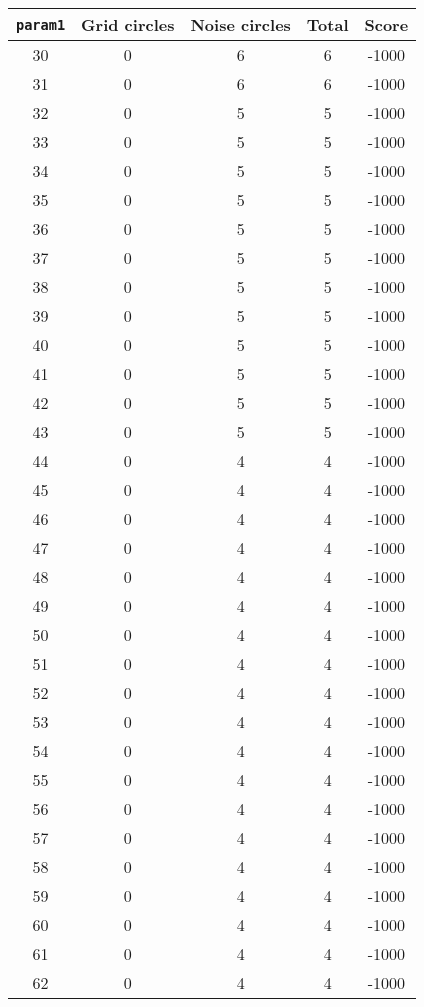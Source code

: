 \documentclass[letterpaper, 12pt]{article}
\begin{document}
\begin{longtable}{|c|c|c|c|c|}
\hline
\textbf{\texttt{param1}} & \textbf{Grid circles} & \textbf{Noise circles} & \textbf{Total} & \textbf{Score} \\
\hline
30 & 0 & 6 & 6 & -1000 \\
\hline
31 & 0 & 6 & 6 & -1000 \\
\hline
32 & 0 & 5 & 5 & -1000 \\
\hline
33 & 0 & 5 & 5 & -1000 \\
\hline
34 & 0 & 5 & 5 & -1000 \\
\hline
35 & 0 & 5 & 5 & -1000 \\
\hline
36 & 0 & 5 & 5 & -1000 \\
\hline
37 & 0 & 5 & 5 & -1000 \\
\hline
38 & 0 & 5 & 5 & -1000 \\
\hline
39 & 0 & 5 & 5 & -1000 \\
\hline
40 & 0 & 5 & 5 & -1000 \\
\hline
41 & 0 & 5 & 5 & -1000 \\
\hline
42 & 0 & 5 & 5 & -1000 \\
\hline
43 & 0 & 5 & 5 & -1000 \\
\hline
44 & 0 & 4 & 4 & -1000 \\
\hline
45 & 0 & 4 & 4 & -1000 \\
\hline
46 & 0 & 4 & 4 & -1000 \\
\hline
47 & 0 & 4 & 4 & -1000 \\
\hline
48 & 0 & 4 & 4 & -1000 \\
\hline
49 & 0 & 4 & 4 & -1000 \\
\hline
50 & 0 & 4 & 4 & -1000 \\
\hline
51 & 0 & 4 & 4 & -1000 \\
\hline
52 & 0 & 4 & 4 & -1000 \\
\hline
53 & 0 & 4 & 4 & -1000 \\
\hline
54 & 0 & 4 & 4 & -1000 \\
\hline
55 & 0 & 4 & 4 & -1000 \\
\hline
56 & 0 & 4 & 4 & -1000 \\
\hline
57 & 0 & 4 & 4 & -1000 \\
\hline
58 & 0 & 4 & 4 & -1000 \\
\hline
59 & 0 & 4 & 4 & -1000 \\
\hline
60 & 0 & 4 & 4 & -1000 \\
\hline
61 & 0 & 4 & 4 & -1000 \\
\hline
62 & 0 & 4 & 4 & -1000 \\

\end{longtable}
\end{document}
